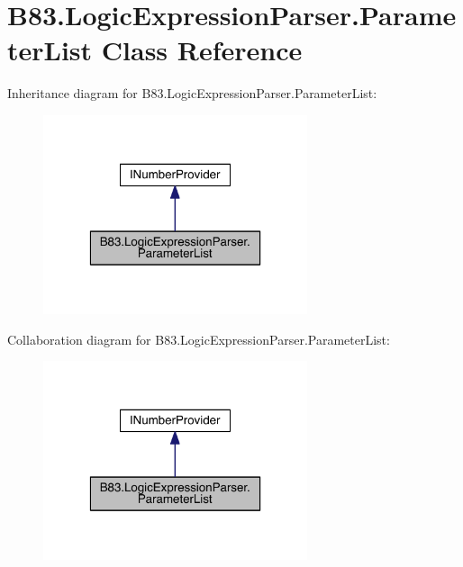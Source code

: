 \hypertarget{class_b83_1_1_logic_expression_parser_1_1_parameter_list}{}\section{B83.\+Logic\+Expression\+Parser.\+Parameter\+List Class Reference}
\label{class_b83_1_1_logic_expression_parser_1_1_parameter_list}


Inheritance diagram for B83.\+Logic\+Expression\+Parser.\+Parameter\+List\+:\nopagebreak
\begin{figure}[H]
\begin{center}
\leavevmode
\includegraphics[width=220pt]{class_b83_1_1_logic_expression_parser_1_1_parameter_list__inherit__graph}
\end{center}
\end{figure}


Collaboration diagram for B83.\+Logic\+Expression\+Parser.\+Parameter\+List\+:\nopagebreak
\begin{figure}[H]
\begin{center}
\leavevmode
\includegraphics[width=220pt]{class_b83_1_1_logic_expression_parser_1_1_parameter_list__coll__graph}
\end{center}
\end{figure}
